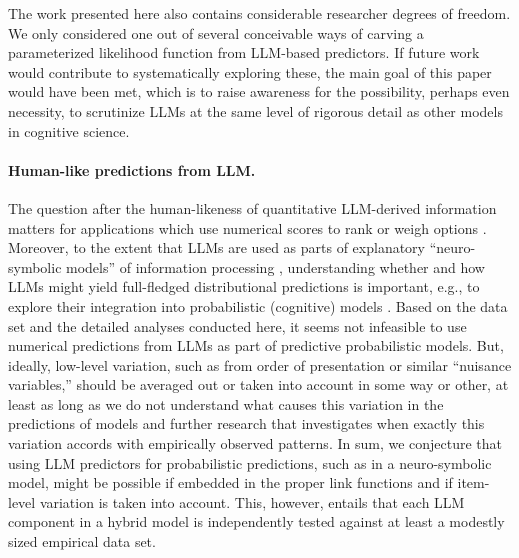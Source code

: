 \documentclass[fleqn]{article}
\begin{document}
The work presented here also contains considerable researcher degrees of freedom.
We only considered one out of several conceivable ways of carving a parameterized likelihood function from LLM-based predictors.
If future work would contribute to systematically exploring these, the main goal of this paper would have been met, which is to raise awareness for the possibility, perhaps even necessity, to scrutinize LLMs at the same level of rigorous detail as other models in cognitive science.

\paragraph{Human-like predictions from LLM.}
The question after the human-likeness of quantitative LLM-derived information matters for applications which use numerical scores to rank or weigh options \citep[e.g.,][]{ParkOBrien2023:Generative-Agen,ZhangLehman2023:OMNI:-Open-ende}.
Moreover, to the extent that LLMs are used as parts of explanatory ``neuro-symbolic models'' of information processing \citep{GarcezLamb2020:Neurosymbolic-A}, understanding whether and how LLMs might yield full-fledged distributional predictions is important, e.g., to explore their integration into probabilistic (cognitive) models \citep[c.f.,][]{Frank2023:Large-language-,TsvilodubCarcassi2024:Towards-Neuro-S}.
Based on the data set and the detailed analyses conducted here, it seems not infeasible to use numerical predictions from LLMs as part of predictive probabilistic models.
But, ideally, low-level variation, such as from order of presentation or similar ``nuisance variables,'' should be averaged out or taken into account in some way or other, at least as long as we do not understand what causes this variation in the predictions of models and further research that investigates when exactly this variation accords with empirically observed patterns.
In sum, we conjecture that using LLM predictors for probabilistic predictions, such as in a neuro-symbolic model, might be possible if embedded in the proper link functions and if item-level variation is taken into account.
This, however, entails that each LLM component in a hybrid model is independently tested against at least a modestly sized empirical data set.
\end{document}
